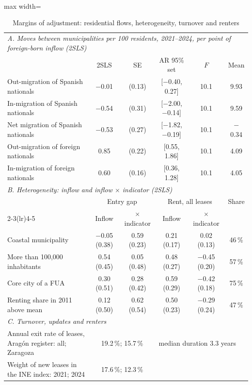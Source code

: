 \begin{table}[!htbp]\centering\small
\caption{Margins of adjustment: residential flows, heterogeneity, turnover and renters}\label{tab:margins}
\begin{adjustbox}{max width=\linewidth}\begin{tabular}{lccccc}\toprule
\multicolumn{6}{l}{\textit{A. Moves between municipalities per 100 residents, 2021--2024, per point of foreign-born inflow (2SLS)}}\\
 & 2SLS & SE & AR 95\% set & $F$ & Mean\\
Out-migration of Spanish nationals & $-$0.01 & (0.13) & [$-$0.40, 0.27] & 10.1 & 9.93\\
In-migration of Spanish nationals & $-$0.54 & (0.31) & [$-$2.00, $-$0.14] & 10.1 & 9.59\\
Net migration of Spanish nationals & $-$0.53 & (0.27) & [$-$1.82, $-$0.19] & 10.1 & $-$0.34\\
Out-migration of foreign nationals & 0.85 & (0.22) & [0.55, 1.86] & 10.1 & 4.09\\
In-migration of foreign nationals & 0.60 & (0.16) & [0.36, 1.28] & 10.1 & 4.05\\
\midrule
\multicolumn{6}{l}{\textit{B. Heterogeneity: inflow and inflow $\times$ indicator (2SLS)}}\\
 & \multicolumn{2}{c}{Entry gap} & \multicolumn{2}{c}{Rent, all leases} & Share\\\cmidrule(lr){2-3}\cmidrule(lr){4-5}
 & Inflow & $\times$ indicator & Inflow & $\times$ indicator & \\
Coastal municipality & $-$0.05 (0.38) & 0.59 (0.23) & 0.21 (0.17) & 0.02 (0.13) & 46\,\%\\
More than 100,000 inhabitants & 0.54 (0.45) & 0.05 (0.48) & 0.48 (0.27) & $-$0.45 (0.20) & 57\,\%\\
Core city of a FUA & 0.30 (0.51) & 0.28 (0.42) & 0.59 (0.29) & $-$0.42 (0.18) & 75\,\%\\
Renting share in 2011 above mean & 0.12 (0.50) & 0.62 (0.54) & 0.50 (0.23) & $-$0.29 (0.24) & 47\,\%\\
\midrule
\multicolumn{6}{l}{\textit{C. Turnover, updates and renters}}\\
Annual exit rate of leases, Aragón register: all; Zaragoza & \multicolumn{2}{c}{19.2\,\%; 15.7\,\%} & \multicolumn{3}{l}{median duration 3.3 years}\\
Weight of new leases in the INE index: 2021; 2024 & \multicolumn{2}{c}{17.6\,\%; 12.3\,\%} & & & \\

\end{tabular}
\end{adjustbox}
\end{table}
